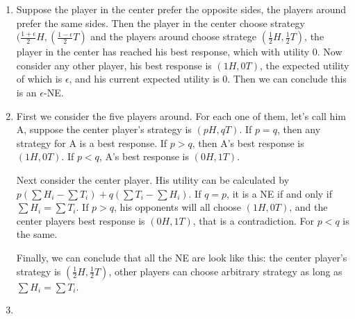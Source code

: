\documentclass[12pt]{cgtmd}
\begin{document}

\begin{enumerate}
    \item Suppose the player in the center prefer the opposite sides, the players around prefer the same sides. Then the player in the center choose strategy $(\frac{1 + \epsilon}{2}H, (\frac{1 - \epsilon}{2}T)$ and the players around choose stratege $(\frac{1}{2}H, \frac{1}{2}T)$, the player in the center has reached his best response, which with utility $0$. Now consider any other player, his best response is $(1H, 0T)$, the expected utility of which is $\epsilon$, and his current expected utility is $0$. Then we can conclude this is an $\epsilon$-NE.
    \item First we consider the five players around. For each one of them, let's call him A, suppose the center player's strategy is $(pH, qT)$. If $p = q$, then any strategy for A is a best response. If $p > q$, then A's best response is $(1H, 0T)$. If $p < q$, A's best response is $(0H, 1T)$. 
        
        Next consider the center player. His utility can be calculated by $p(\sum H_i - \sum T_i) + q(\sum T_i - \sum H_i)$. If $q = p$, it is a NE if and only if $\sum H_i = \sum T_i$.  If $p > q$, his opponents will all choose $(1H, 0T)$, and the center players best response is $(0H, 1T)$, that is a contradiction. For $p < q$ is the same.

        Finally, we can conclude that all the NE are look like this: the center player's strategy is $(\frac{1}{2}H, \frac{1}{2}T)$, other players can choose arbitrary strategy as long as $\sum H_i = \sum T_i$.
    \item 

\end{enumerate}
\end{document}
